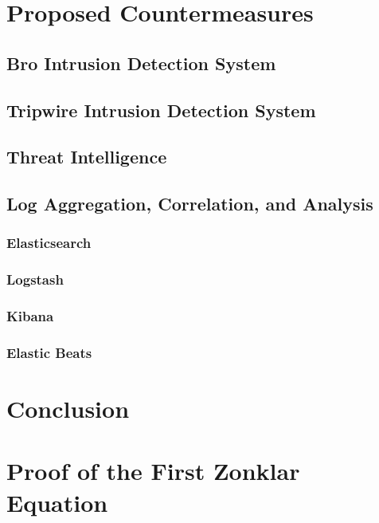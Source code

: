 \documentclass[conference]{IEEEtran}
\begin{document}
\section{Proposed Countermeasures}

\subsection{Bro Intrusion Detection System}

\subsection{Tripwire Intrusion Detection System}

\subsection{Threat Intelligence}

\subsection{Log Aggregation, Correlation, and Analysis}

\subsubsection{Elasticsearch}

\subsubsection{Logstash}

\subsubsection{Kibana}

\subsubsection{Elastic Beats}


\section{Conclusion}


\appendices
\section{Proof of the First Zonklar Equation}
\blindtext
\end{document}
